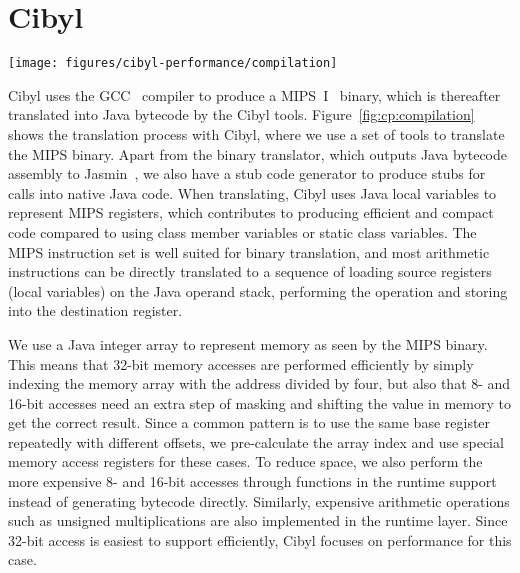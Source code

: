 \section{Cibyl}
\label{sec:cp:cibyl}
\begin{figure*}[t]
  \begin{center}
    \texttt{[image: figures/cibyl-performance/compilation]}
    \caption[Cibyl translation process]{Translation process in Cibyl. Gray boxes show unmodified
      third-party tools.}
    \label{fig:cp:compilation}
  \end{center}
\end{figure*}

Cibyl uses the GCC~\cite{gcc} compiler to produce a MIPS~I~\cite{kane88mips}
binary, which is thereafter translated into Java bytecode by the Cibyl tools.
Figure~\ref{fig:cp:compilation} shows the translation process with Cibyl,
where we use a set of tools to translate the MIPS binary. Apart from the
binary translator, which outputs Java bytecode assembly to
Jasmin~\cite{jasmin}, we also have a stub code generator to produce stubs for
calls into native Java code. When translating, Cibyl uses Java local variables
to represent MIPS registers, which contributes to producing efficient and
compact code compared to using class member variables or static class
variables. The MIPS instruction set is well suited for binary translation, and
most arithmetic instructions can be directly translated to a sequence of
loading source registers (local variables) on the Java operand stack,
performing the operation and storing into the destination register.

We use a Java integer array to represent memory as seen by the MIPS binary.
This means that 32-bit memory accesses are performed efficiently by simply
indexing the memory array with the address divided by four, but also that 8-
and 16-bit accesses need an extra step of masking and shifting the value in
memory to get the correct result. Since a common pattern is to use the same
base register repeatedly with different offsets, we pre-calculate the array
index and use special memory access registers for these cases. To reduce space, we
also perform the more expensive 8- and 16-bit accesses through functions in
the runtime support instead of generating bytecode directly. Similarly,
expensive arithmetic operations such as unsigned multiplications are also
implemented in the runtime layer. Since 32-bit access is easiest to support
efficiently, Cibyl focuses on performance for this case.

